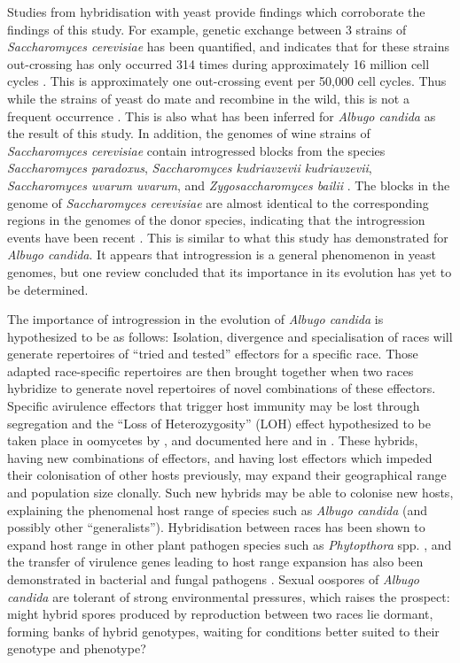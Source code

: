 Studies from hybridisation with yeast provide findings which corroborate the findings of this study. For example, genetic exchange between 3 strains of \textit{Saccharomyces cerevisiae} has been quantified, and indicates that for these strains out-crossing has only occurred 314 times during approximately 16 million cell cycles \parencite{Ruderfer2006PopulationYeast.}. This is approximately one out-crossing event per 50,000 cell cycles. Thus while the strains of yeast do mate and recombine in the wild, this is not a frequent occurrence \parencite{Ruderfer2006PopulationYeast.}⁠. This is also what has been inferred for \textit{Albugo candida} as the result of this study. In addition, the genomes of wine strains of \textit{Saccharomyces cerevisiae} contain introgressed blocks from the species \textit{Saccharomyces paradoxus}, \textit{Saccharomyces kudriavzevii kudriavzevii}, \textit{Saccharomyces uvarum uvarum}, and \textit{Zygosaccharomyces bailii} \parencite{Dujon2010YeastGenomics}⁠. The blocks in the genome of \textit{Saccharomyces cerevisiae} are almost identical to the corresponding regions in the genomes of the donor species, indicating that the introgression events have been recent \parencite{Dujon2010YeastGenomics}⁠. This is similar to what this study has demonstrated for \textit{Albugo candida}. It appears that introgression is a general phenomenon in yeast genomes, but one review concluded that its importance in its evolution has yet to be determined.

The importance of introgression in the evolution of \textit{Albugo candida} is hypothesized to be as follows: Isolation, divergence and specialisation of races will generate repertoires of “tried and tested” effectors for a specific race. Those  adapted race-specific repertoires are then brought together when two races hybridize to generate novel repertoires of novel combinations of these effectors. Specific avirulence effectors that trigger host immunity may be lost through segregation and the “Loss of Heterozygosity” (LOH) effect hypothesized to be taken place in oomycetes by \cite{Lamour2012PathogenCapsici}, and documented here and in \cite{McMullan2015a}. These hybrids, having new combinations of effectors, and having lost effectors which impeded their colonisation of other hosts previously, may expand their geographical range and population size clonally. Such new hybrids may be able to colonise new hosts, explaining the phenomenal host range of species such as \textit{Albugo candida} (and possibly other “generalists”). Hybridisation between races has been shown to expand host range in other plant pathogen species such as \textit{Phytopthora} spp. \parencite{Ersek1995CreationFusion}⁠, and the transfer of virulence genes leading to host range expansion has also been demonstrated in bacterial and fungal pathogens \parencite{FordDoolittle1999LateralGenomics,Mehrabi2011HorizontalRange}. Sexual oospores of \textit{Albugo candida} are tolerant of strong environmental pressures, which raises the prospect: might hybrid spores produced by reproduction between two races lie dormant, forming banks of hybrid genotypes, waiting for conditions better suited to their genotype and phenotype?

